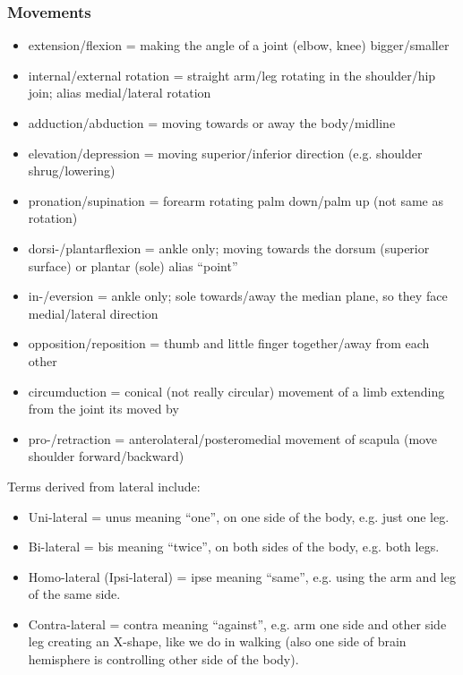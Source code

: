 \subsubsection{Movements}

\begin{itemize}
    \setlength\itemsep{0em}
    \item extension/flexion = making the angle of a joint (elbow, knee) bigger/smaller
    \item internal/external rotation = straight arm/leg rotating in the shoulder/hip join; alias medial/lateral rotation
    \item adduction/abduction = moving towards or away the body/midline
    \item elevation/depression = moving superior/inferior direction (e.g. shoulder shrug/lowering)
    \item pronation/supination = forearm rotating palm down/palm up (not same as rotation)
    \item dorsi-/plantarflexion = ankle only; moving towards the dorsum (superior surface) or plantar (sole) alias ``point''
    \item in-/eversion = ankle only; sole towards/away the median plane, so they face medial/lateral direction
    \item opposition/reposition = thumb and little finger together/away from each other
    \item circumduction = conical (not really circular) movement of a limb extending from the joint its moved by
    \item pro-/retraction = anterolateral/posteromedial movement of scapula (move shoulder forward/backward)
\end{itemize}

Terms derived from lateral include:

\begin{itemize}
    \setlength\itemsep{0em}
    \item Uni-lateral = unus meaning ``one'', on one side of the body, e.g. just one leg.
    \item Bi-lateral = bis meaning ``twice'', on both sides of the body, e.g. both legs.
    \item Homo-lateral (Ipsi-lateral) = ipse meaning ``same'', e.g. using the arm and leg of the same side.
    \item Contra-lateral = contra meaning ``against'', e.g. arm one side and other side leg creating an X-shape, like we do in walking (also one side of brain hemisphere is controlling other side of the body).
\end{itemize}

